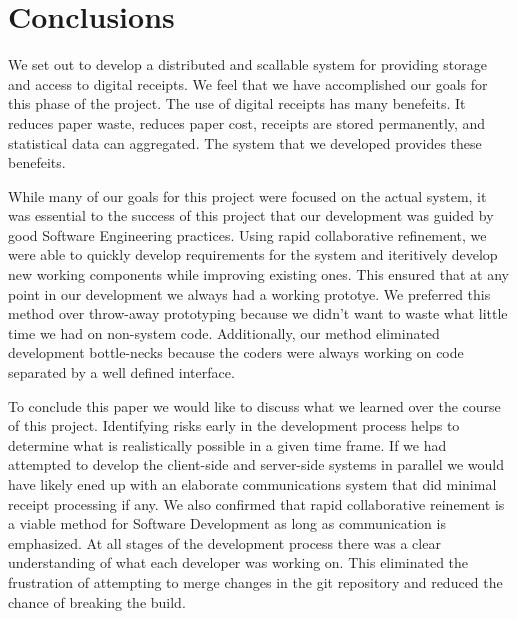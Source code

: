 \section{Conclusions}
\label{sec:conclusion}
We set out to develop a distributed and scallable system for providing storage and access to digital receipts.  We feel that we have accomplished our goals for this phase of the project.  The use of digital receipts has many benefeits.  It reduces paper waste, reduces paper cost, receipts are stored permanently, and statistical data can aggregated.  The system that we developed provides these benefeits.

While many of our goals for this project were focused on the actual system, it was essential to the success of this project that our development was guided by good Software Engineering practices.  Using rapid collaborative refinement, we were able to quickly develop requirements for the system and iteritively develop new working components while improving existing ones.  This ensured that at any point in our development we always had a working prototye.  We preferred this method over throw-away prototyping because we didn't want to waste what little time we had on non-system code.  Additionally, our method eliminated development bottle-necks because the coders were always working on code separated by a well defined interface.

To conclude this paper we would like to discuss what we learned over the course of this project.  Identifying risks early in the development process helps to determine what is realistically possible in a given time frame.  If we had attempted to develop the client-side and server-side systems in parallel we would have likely ened up with an elaborate communications system that did minimal receipt processing if any.  We also confirmed that rapid collaborative reinement is a viable method for Software Development as long as communication is emphasized.  At all stages of the development process there was a clear understanding of what each developer was working on.  This eliminated the frustration of attempting to merge changes in the git repository and reduced the chance of breaking the build.


